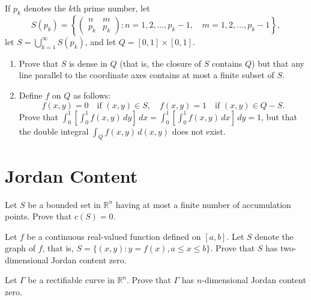 \begin{problembox}
If \( p_k \) denotes the \( k \)th prime number, let
\[S(p_k) = \left\{ \begin{pmatrix}
n & m \\
p_k & p_k
\end{pmatrix} : n = 1, 2, \ldots, p_k - 1, \quad m = 1, 2, \ldots, p_k - 1 \right\},\]
let \( S = \bigcup_{k=1}^{\infty} S(p_k) \), and let \( Q = [0, 1] \times [0, 1] \).

\begin{enumerate}[label=(\alph*)]
    \item Prove that \( S \) is dense in \( Q \) (that is, the closure of \( S \) contains \( Q \)) but that any line parallel to the coordinate axes contains at most a finite subset of \( S \).
    
    \item Define \( f \) on \( Q \) as follows:
    \[f(x, y) = 0 \quad \text{if } (x, y) \in S, \quad f(x, y) = 1 \quad \text{if } (x, y) \in Q - S.\]
    Prove that \( \int_{0}^{1} \left[ \int_{0}^{1} f(x, y) \, dy \right] \, dx = \int_{0}^{1} \left[ \int_{0}^{1} f(x, y) \, dx \right] \, dy = 1 \), but that the double integral \( \int_{Q} f(x, y) \, d(x, y) \) does not exist.
\end{enumerate}
\end{problembox}

\section{Jordan Content}

\begin{problembox}
Let \( S \) be a bounded set in \( \mathbb{R}^n \) having at most a finite number of accumulation points. Prove that \( c(S) = 0 \).
\end{problembox}

\begin{problembox}
Let \( f \) be a continuous real-valued function defined on \([a, b]\). Let \( S \) denote the graph of \( f \), that is, \( S = \{(x, y) : y = f(x), a \leq x \leq b\} \). Prove that \( S \) has two-dimensional Jordan content zero.
\end{problembox}

\begin{problembox}
Let \( \Gamma \) be a rectifiable curve in \( \mathbb{R}^n \). Prove that \( \Gamma \) has \( n \)-dimensional Jordan content zero.
\end{problembox}

